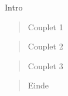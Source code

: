 \begin{song}{}

\begin{instrumental}{Intro}
\measure{} \measure{} \measure{} \measure{} \measure{} \measure{} \measure{} \measure{}
\measure{} \measure{} \measure{} \measure{} \measure{} \measure{} \measure{} \measure{}
\end{instrumental}

\begin{verse}{Couplet 1}
\end{verse}

\begin{verse}{Couplet 2}
\end{verse}

\begin{verse}{Couplet 3}
\end{verse}

\begin{verse}{Einde}
\end{verse}
\end{song}

\clearpage
\begin{translation}[]

\end{translation}
